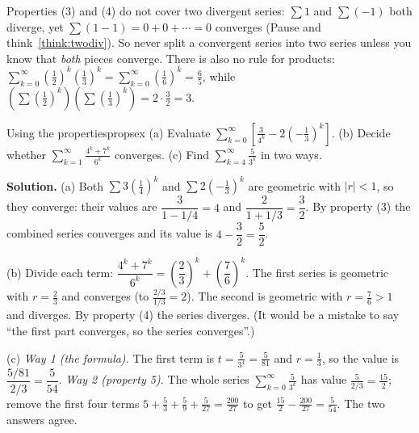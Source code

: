 \documentclass[11pt]{article}
\begin{document}
\begin{warn}
Properties (3) and (4) do not cover two divergent series: $\sum1$ and $\sum(-1)$ both diverge, yet $\sum(1-1)=0+0+\cdots=0$ converges (Pause and think~\ref{think:twodiv}). So never split a convergent series into two series unless you know that \emph{both} pieces converge. There is also no rule for products: $\sum_{k=0}^\infty\left(\frac12\right)^k\left(\frac13\right)^k=\sum_{k=0}^\infty\left(\frac16\right)^k=\frac65$, while $\left(\sum\left(\frac12\right)^k\right)\left(\sum\left(\frac13\right)^k\right)=2\cdot\frac32=3$.
\end{warn}

\begin{exmp}{Using the properties}{propsex}
(a) Evaluate $\displaystyle\sum_{k=0}^\infty\left[\frac3{4^k}-2\left(-\frac13\right)^k\right]$. (b) Decide whether $\displaystyle\sum_{k=1}^\infty\frac{4^k+7^k}{6^k}$ converges. (c) Find $\displaystyle\sum_{k=4}^\infty\frac5{3^k}$ in two ways.

\textbf{Solution.} (a) Both $\sum3\left(\frac14\right)^k$ and $\sum2\left(-\frac13\right)^k$ are geometric with $|r|<1$, so they converge: their values are $\dfrac3{1-1/4}=4$ and $\dfrac2{1+1/3}=\dfrac32$. By property (3) the combined series converges and its value is $4-\dfrac32=\dfrac52$.


(b) Divide each term: $\dfrac{4^k+7^k}{6^k}=\left(\dfrac23\right)^k+\left(\dfrac76\right)^k$. The first series is geometric with $r=\frac23$ and converges (to $\frac{2/3}{1/3}=2$). The second is geometric with $r=\frac76>1$ and diverges. By property (4) the series diverges. (It would be a mistake to say ``the first part converges, so the series converges''.)

(c) \emph{Way 1 (the formula).} The first term is $t=\frac5{3^4}=\frac5{81}$ and $r=\frac13$, so the value is $\dfrac{5/81}{2/3}=\dfrac5{54}$. \emph{Way 2 (property 5).} The whole series $\sum_{k=0}^\infty\frac5{3^k}$ has value $\frac5{2/3}=\frac{15}2$; remove the first four terms $5+\frac53+\frac59+\frac5{27}=\frac{200}{27}$ to get $\frac{15}2-\frac{200}{27}=\frac5{54}$. The two answers agree.
\end{exmp}
\end{document}
